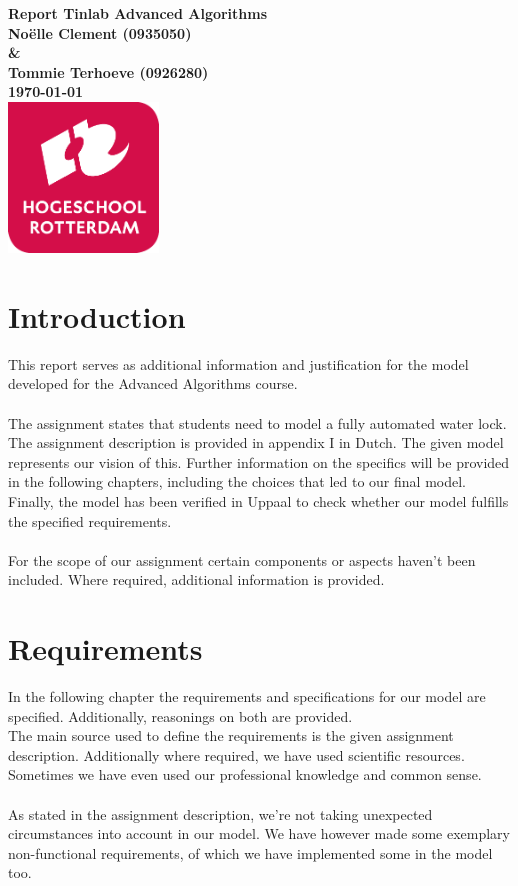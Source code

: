 \documentclass{article}
\begin{document}
\sffamily
\begin{titlepage}
  \centering
    \vfill
    {\bfseries\Huge
      Report Tinlab Advanced Algorithms \\
        \vskip2cm
      }
      {\bfseries\Large
        No{\"e}lle Clement (0935050) \\
        \& \\
        Tommie Terhoeve (0926280)\\
      }
      {
        \bfseries\normalsize
        \vskip 1cm
        \today\\
    }    
    \vfill
    \includegraphics[width=4cm]{logohr.png} %
    \vfill
    \vfill
\end{titlepage}
\newpage
\tableofcontents

\newpage
\section{Introduction}
    This report serves as additional information and justification for the model developed for the Advanced Algorithms course. \\\\
    The assignment states that students need to model a fully automated water lock. The assignment description is provided in appendix I in Dutch. The given model represents our vision of this. Further information on the specifics will be provided in the following chapters, including the choices that led to our final model. Finally, the model has been verified in Uppaal to check whether our model fulfills the specified requirements. \\\\
    For the scope of our assignment certain components or aspects haven't been included. Where required, additional information is provided. 

\newpage

\section{Requirements}
    In the following chapter the requirements and specifications for our model are specified. Additionally, reasonings on both are provided. \\
    The main source used to define the requirements is the given assignment description. Additionally where required, we have used scientific resources. Sometimes we have even used our professional knowledge and common sense. \\\\
    As stated in the assignment description, we're not taking unexpected circumstances into account in our model. We have however made some exemplary non-functional requirements, of which we have implemented some in the model too.  
    
\end{document}
